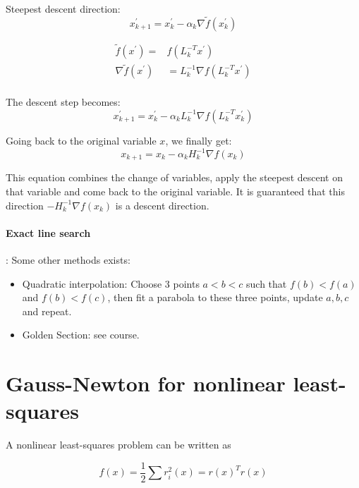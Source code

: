 Steepest descent direction:
\begin{equation}
    x^{\prime}_{k+1} = x^{\prime}_ k - \alpha_k \nabla \tilde{f}(x^{\prime}_k)
\end{equation}


\begin{equation}
    \begin{split}
        \tilde{f}(x^\prime) =& f(L_k^{-T}x^\prime) \\
        \nabla \tilde{f}(x^\prime) &= L^{-1}_k \nabla f(L_k^{-T}x^\prime) \\
    \end{split}
\end{equation}

The descent step becomes:
\begin{equation}
    x_{k+1}^\prime = x_k^\prime - \alpha_k L_k^{-1} \nabla f(L_k^{-T}x_k^\prime)
\end{equation}

Going back to the original variable $x$, we finally get:
\begin{equation}
    x_{k+1} = x_k - \alpha_k H_k^{-1} \nabla f(x_k)
\end{equation}

This equation combines the change of variables, apply the steepest descent on that variable and come back to the original variable.
It is guaranteed that this direction $-H_k^{-1}\nabla f(x_k)$ is a descent direction.

\paragraph{Exact line search}: Some other methods exists:
\begin{itemize}
    \item Quadratic interpolation: Choose 3 points $a < b < c$ such that $f(b) < f(a)$ and $f(b) < f(c)$, then fit a parabola to these three points, update $a, b, c$ and repeat.
    \item Golden Section: see course.
\end{itemize}


\section{Gauss-Newton for nonlinear least-squares}

A nonlinear least-squares problem can be written as

\begin{equation}
    f(x) = \frac{1}{2} \sum r_i^2(x) = r(x)^Tr(x)
\end{equation}


